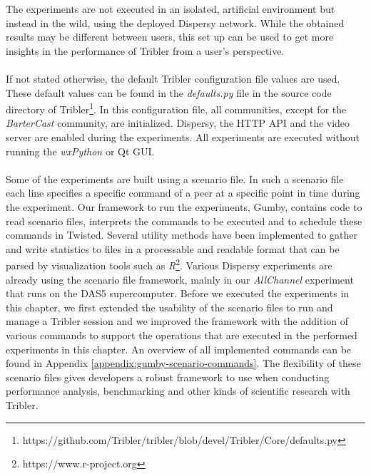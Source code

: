 The experiments are not executed in an isolated, artificial environment but instead in the wild, using the deployed Dispersy network. While the obtained results may be different between users, this set up can be used to get more insights in the performance of Tribler from a user's perspective.\\\\
If not stated otherwise, the default Tribler configuration file values are used. These default values can be found in the \emph{defaults.py} file in the source code directory of Tribler\footnote{https://github.com/Tribler/tribler/blob/devel/Tribler/Core/defaults.py}. In this configuration file, all communities, except for the \emph{BarterCast} community, are initialized. Dispersy, the HTTP API and the video server are enabled during the experiments. All experiments are executed without running the \emph{wxPython} or Qt GUI.\\\\
Some of the experiments are built using a scenario file. In such a scenario file each line specifies a specific command of a peer at a specific point in time during the experiment. Our framework to run the experiments, Gumby, contains code to read scenario files, interprets the commands to be executed and to schedule these commands in Twisted. Several utility methods have been implemented to gather and write statistics to files in a processable and readable format that can be parsed by visualization tools such as \emph{R}\footnote{https://www.r-project.org}. Various Dispersy experiments are already using the scenario file framework, mainly in our \emph{AllChannel} experiment that runs on the DAS5 supercomputer. Before we executed the experiments in this chapter, we first extended the usability of the scenario files to run and manage a Tribler session and we improved the framework with the addition of various commands to support the operations that are executed in the performed experiments in this chapter. An overview of all implemented commands can be found in Appendix \ref{appendix:gumby-scenario-commands}. The flexibility of these scenario files gives developers a robust framework to use when conducting performance analysis, benchmarking and other kinds of scientific research with Tribler.

